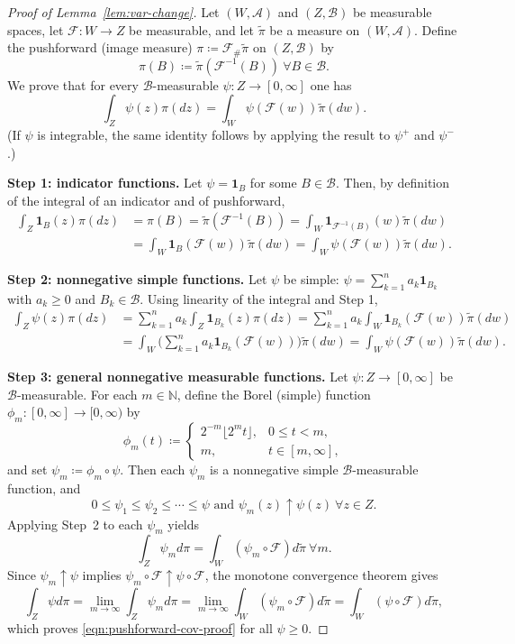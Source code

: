 \documentclass{article}
\theoremstyle{plain}
\theoremstyle{definition}
\theoremstyle{remark}
\numberwithin{equation}{section}
\begin{document}
\begin{proof}[Proof of Lemma~\ref{lem:var-change}]
Let $(W,\mathcal A)$ and $(Z,\mathcal B)$ be measurable spaces, let $\mathcal F:W\to Z$ be measurable, and let $\widetilde\pi$ be a measure on $(W,\mathcal A)$.
Define the pushforward (image measure) $\pi\coloneqq \mathcal F_\#\widetilde\pi$ on $(Z,\mathcal B)$ by
$$
\pi(B)\coloneqq\widetilde\pi(\mathcal F^{-1}(B))\ \forall B\in\mathcal B.
$$
We prove that for every $\mathcal B$-measurable $\psi:Z\to[0,\infty]$ one has
\begin{equation}\label{eqn:pushforward-cov-proof}
\int_Z\psi(z)\pi(dz)=\int_W\psi(\mathcal F(w))\widetilde\pi(dw).
\end{equation}
(If $\psi$ is integrable, the same identity follows by applying the result to $\psi^+$ and $\psi^-$.)

\textbf{Step 1: indicator functions.}
Let $\psi=\mathbf1_B$ for some $B\in\mathcal B$. Then, by definition of the integral of an indicator and of pushforward,
\begin{align*}
\int_Z\mathbf1_B(z)\pi(dz)&=\pi(B)=\widetilde\pi(\mathcal F^{-1}(B))=\int_W\mathbf1_{\mathcal F^{-1}(B)}(w)\widetilde\pi(dw)\\
&=\int_W\mathbf1_B(\mathcal F(w))\widetilde\pi(dw)=\int_W\psi(\mathcal F(w))\widetilde\pi(dw).
\end{align*}

\textbf{Step 2: nonnegative simple functions.}
Let $\psi$ be simple: $\psi=\sum_{k=1}^na_k\mathbf1_{B_k}$ with $a_k\ge 0$ and $B_k\in\mathcal B$.
Using linearity of the integral and Step 1,
\begin{align*}
\int_Z\psi(z)\pi(dz)&=\sum_{k=1}^na_k\int_Z\mathbf1_{B_k}(z)\pi(dz)=\sum_{k=1}^na_k\int_W\mathbf1_{B_k}(\mathcal F(w))\widetilde\pi(dw)\\
&=\int_W\Big(\sum_{k=1}^na_k\mathbf1_{B_k}(\mathcal F(w))\Big)\widetilde\pi(dw)=\int_W\psi(\mathcal F(w))\widetilde\pi(dw).
\end{align*}

\textbf{Step 3: general nonnegative measurable functions.}
Let $\psi:Z\to[0,\infty]$ be $\mathcal B$-measurable.
For each $m\in\mathbb N$, define the Borel (simple) function $\phi_m:[0,\infty]\to[0,\infty)$ by
$$
\phi_m(t)\coloneqq
\begin{cases}
2^{-m}\lfloor2^mt\rfloor,&0\le t<m,\\
m,&t\in[m,\infty],
\end{cases}
$$
and set $\psi_m\coloneqq\phi_m\circ\psi$.
Then each $\psi_m$ is a nonnegative simple $\mathcal B$-measurable function, and
$$
0\le\psi_1\le\psi_2\le\cdots\le\psi\text{ and }\psi_m(z)\uparrow \psi(z)\ \forall z\in Z.
$$
Applying Step~2 to each $\psi_m$ yields
$$
\int_Z\psi_md\pi=\int_W(\psi_m\circ\mathcal F)d\widetilde\pi\ \forall m.
$$
Since $\psi_m\uparrow\psi$ implies $\psi_m\circ\mathcal F\uparrow \psi\circ\mathcal F$, the monotone convergence theorem gives
$$
\int_Z\psi d\pi=\lim_{m\to\infty}\int_Z\psi_md\pi=\lim_{m\to\infty}\int_W(\psi_m\circ\mathcal F)d\widetilde\pi=\int_W(\psi\circ\mathcal F)d\widetilde\pi,
$$
which proves \eqref{eqn:pushforward-cov-proof} for all $\psi\ge 0$.


\end{proof}
\end{document}
